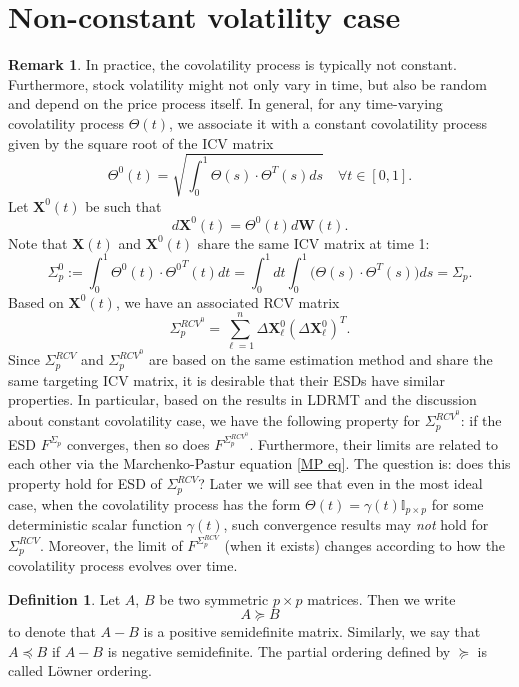 \documentclass[a4paper,11pt]{article}
\theoremstyle{plain}
\theoremstyle{definition}
\newtheorem{defn}[thm]{Definition}
\newtheorem{rmrk}[thm]{Remark}
\begin{document}
	\section*{Non-constant volatility case}
	\begin{rmrk}
		In practice, the covolatility process is typically not constant. Furthermore, stock volatility might not only vary in time, but also be random and depend on the price process itself. In general, for any time-varying covolatility process $\Theta(t)$, we associate it with a constant covolatility process given by the square root of the ICV matrix
		\[ \Theta^0(t) = \sqrt{\int_0^1\Theta(s) \cdot \Theta^T(s) ds} \quad \forall t \in [0, 1]. \]
		Let $\mathbf{X}^0(t)$ be such that
		\[ d\mathbf{X}^0(t) = \Theta^0(t) d\mathbf{W}(t). \]
		Note that $\mathbf{X}(t)$ and $\mathbf{X}^0(t)$ share the same ICV matrix at time 1:
		\[ \Sigma_p^0 :=  \int_0^1 \Theta^0(t) \cdot {\Theta^0}^T(t) dt = \int_0^1 dt \int_0^1\Big( \Theta(s) \cdot {\Theta}^T(s)\Big) ds = \Sigma_p.  \]
		Based on $\mathbf{X}^0(t)$, we have an associated RCV matrix
		\[ \Sigma_p^{RCV^0} = \sum_{\ell=1}^{n} \Delta \mathbf{X}_\ell^0 (\Delta \mathbf{X}_\ell^0)^T. \]
		Since $\Sigma_p^{RCV}$ and $\Sigma_p^{RCV^0}$ are based on the same estimation method and share the same targeting ICV matrix, it is desirable that their ESDs have similar properties. In particular, based on the results in LDRMT and the discussion about constant covolatility case, we have the following property for $\Sigma_p^{RCV^0}$: if the ESD $F^{\Sigma_p}$ converges, then so does $F^{\Sigma_p^{RCV^0}}$. Furthermore, their limits are related to each other via the Marchenko-Pastur equation \eqref{MP eq}. The question is: does this property hold for ESD of $\Sigma_p^{RCV}$? Later we will see that even in the most ideal case, when the covolatility process has the form $\Theta(t) =\gamma(t) \mathbb{I}_{p \times p}$ for some deterministic scalar function $\gamma(t)$, such convergence results may \textit{not} hold for $\Sigma_p^{RCV}$. Moreover, the limit of $F^{\Sigma_p^{RCV}}$ (when it exists) changes according to how the covolatility process evolves over time.
	\end{rmrk}
	
	\begin{defn}
		Let $A$, $B$ be two symmetric $p \times p$ matrices. Then we write
		\[ A \succeq B\]
		to denote that $A-B$ is a positive semidefinite matrix. Similarly, we say that $A \preceq B$ if $A-B$ is negative semidefinite. The partial ordering defined by $\succeq$ is called L\"owner ordering.
	\end{defn}
	
\end{document}
